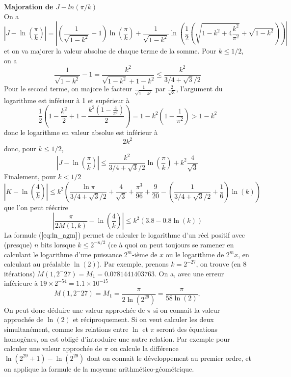 \documentclass[a4paper,11pt]{book}
\begin{document}
\begin{giacjshere}
{\bf Majoration de $J-ln(\pi/k)$}\\
On a
\[ |J - \ln\left(\frac{\pi}{k}\right)|
= \left| (\frac{1}{\sqrt{1-k^2}}-1) \ln\left(\frac{\pi}{k}\right)
+ \frac{1}{\sqrt{1-k^2}}
\ln\left( \frac{1}{2} \left(\sqrt{ 1-k^{2} +4 \frac{k^{2}}{\pi^2}} 
+\sqrt{1-k^{2}} \right) \right) \right| \]
et on va majorer la valeur absolue de chaque terme de la somme.
Pour $k\leq 1/2$, on a
\[ \frac{1}{\sqrt{1-k^2}}-1=\frac{k^2}{\sqrt{1-k^2}+1-k^2} \leq \frac{k^2}{3/4+\sqrt{3}/2} \]
Pour le second terme, on majore le facteur $\frac{1}{\sqrt{1-k^2}}$ par $\frac{2}{\sqrt{3}}$,
l'argument du logarithme est inférieur à 1 et supérieur à
\[ 
\frac{1}{2}(1 - \frac{k^2}{2} +1- \frac{k^2(1-\frac{4}{\pi^2})}{2})
= 1 - k^2 ( 1-\frac{1}{\pi^2}) > 1-k^2
\]
donc le logarithme en valeur absolue est inférieur à
\[ 2 k^2 \]
donc, pour $k\leq 1/2$,
\[ |J-\ln\left(\frac{\pi}{k}\right)| \leq 
\frac{k^2}{3/4+\sqrt{3}/2} \ln\left(\frac{\pi}{k}\right)
+ k^2 \frac{4}{\sqrt{3}} 
\]
Finalement, pour $k<1/2$
\begin{equation} \label{eq:ln_agm0}
 |K-\ln\left(\frac{4}{k}\right) | 
\leq k^2 \left( \frac{\ln \pi}{3/4+\sqrt{3}/2}  + \frac{4}{\sqrt{3} }
+ \frac{\pi^3}{96} + \frac{9}{20}
- (\frac{1}{3/4+\sqrt{3}/2}+\frac{1}{6}) \ln(k) \right) 
\end{equation}
que l'on peut réécrire
\begin{equation} \label{eq:ln_agm}
|\frac{\pi}{2M(1,k)}-\ln\left(\frac{4}{k}\right) |
\leq  k^2(3.8-0.8\ln(k))
\end{equation}
La formule (\(\ref{eq:ln_agm}\)) 
permet de calculer le logarithme d'un r\'eel positif
avec (presque) $n$ bits 
lorsque $k \leq 2^{-n/2}$ (ce \`a quoi on peut toujours se ramener
en calculant le logarithme d'une puissance $2^m$-i\`eme de $x$ ou
le logarithme de $2^{m}x$, en calculant au pr\'ealable $\ln(2)$).
Par exemple, prenons $k=2^{-27}$, on trouve (en 8 itérations)
$M(1,2^-{27})=M_1=0.0781441403763$. 
On a, avec une erreur inférieure à $19 \times 2^{-54}=1.1\times 10^{-15}$
\[ 
M(1,2^-{27})=M_1=\frac{\pi}{2\ln(2^{29})}=\frac{\pi}{58\ln(2)},
\] 
On peut donc d\'eduire une valeur approch\'ee de $\pi $ si on connait
la valeur approchée de $\ln(2)$ et réciproquement.
Si on veut calculer les deux simultan\'ement, comme les relations entre $\ln$
et $\pi$ seront des \'equations homog\`enes, on est oblig\'e
d'introduire une autre relation. Par exemple pour calculer une
valeur approch\'ee de $\pi$ on calcule la diff\'erence
$\ln(2^{29}+1)-\ln(2^{29})$ dont on connait le d\'eveloppement au premier
ordre, et on applique la formule de la moyenne arithm\'etico-g\'eom\'etrique.

\end{giacjshere}
\end{document}
